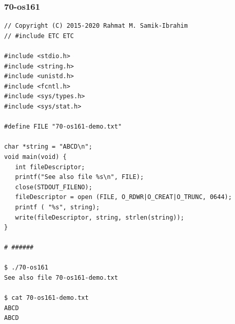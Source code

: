 \documentclass[aspectratio=169, xcolor=table, notheorems, hyperref={pdfpagelabels=false}]{beamer}
\begin{document}
\begin{frame}[fragile]
\frametitle{70-os161}
\begin{lstlisting}[basicstyle=\ttfamily\tiny]
// Copyright (C) 2015-2020 Rahmat M. Samik-Ibrahim
// #include ETC ETC

#include <stdio.h>
#include <string.h>
#include <unistd.h>
#include <fcntl.h>
#include <sys/types.h>
#include <sys/stat.h>

#define FILE "70-os161-demo.txt"

char *string = "ABCD\n";
void main(void) {
   int fileDescriptor;
   printf("See also file %s\n", FILE);
   close(STDOUT_FILENO);
   fileDescriptor = open (FILE, O_RDWR|O_CREAT|O_TRUNC, 0644);
   printf ( "%s", string);
   write(fileDescriptor, string, strlen(string));
}

# ######

$ ./70-os161 
See also file 70-os161-demo.txt

$ cat 70-os161-demo.txt 
ABCD
ABCD

\end{lstlisting}
\end{frame}

\end{document}
